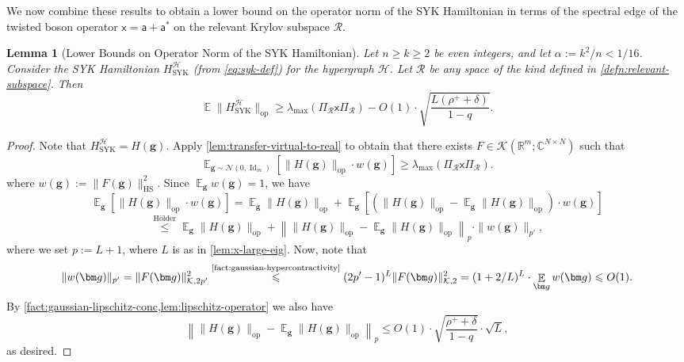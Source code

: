 \documentclass
[11pt,letterpaper]
{article}
\newtheorem{lemma}[theorem]{Lemma}
\theoremstyle{definition}
\newcommand{\cN}{\mathcal{N}}
\newcommand{\sfa}{\mathsf a}
\newcommand{\sfx}{\mathsf x}
\newcommand{\R}{{\mathbb R}}
\newcommand{\1}{\mathbf{1}}
\newcommand{\C}{\mathbb C}
\newcommand{\cH}{\mathcal H}
\newcommand{\Id}{\operatorname{Id}}
\DeclareMathOperator*{\E}{\mathbb{E}}
\newcommand{\cR}{\mathcal R}
\newcommand{\cK}{\mathcal K}
\renewcommand{\geq}{\geqslant}
\renewcommand{\leq}{\leqslant}
\begin{document}
We now combine these results to obtain a lower bound on the operator norm of the SYK Hamiltonian in terms of the spectral edge of the twisted boson operator $\sfx = \sfa + \sfa^*$ on the relevant Krylov subspace $\cR$.
\begin{lemma}[Lower Bounds on Operator Norm of the SYK Hamiltonian]\label{lem:lower-bound-syk-general}
    Let $n\geq k\geq 2$ be even integers, and let $\alpha:= k^2/n < 1/16$. Consider the SYK Hamiltonian $H^\cH_{\operatorname{SYK}}$ (from \cref{eq:syk-def}) for the hypergraph $\cH$. Let $\cR$ be any space of the kind defined in \cref{defn:relevant-subspace}. Then
    \[\E\|H^\cH_{\operatorname{SYK}}\|_{\operatorname{op}}\geq \lambda_{\max}(\Pi_\cR\sfx\Pi_\cR) - O(1)\cdot \sqrt{\frac{L(\rho^+ + \delta)}{1 - q}}.\]
\end{lemma}
\begin{proof}
    Note that $H^\cH_{\operatorname{SYK}} = H(\bm g)$. Apply \cref{lem:transfer-virtual-to-real} to obtain that there exists $F\in\cK(\R^m;\C^{N\times N})$ such that 
    \[\E_{\bm g\sim\cN(0, \Id_m)}\left[\|H(\bm g)\|_{\operatorname{op}}\cdot w(\bm g)\right]\geq\lambda_{\max}(\Pi_\cR\sfx\Pi_\cR).\]
    where $w(\bm g) := \|F(\bm g)\|^2_{\operatorname{HS}}$. Since $\E_{\bm g}w(\bm g) = 1$, we have 
    \[\E_{\bm g}\left[\|H(\bm g)\|_{\operatorname{op}}\cdot w(\bm g)\right] = \E_{\bm g}\|H(\bm g)\|_{\operatorname{op}} + \E_{\bm g}\left[\left(\|H(\bm g)\|_{\operatorname{op}} - \E_{\bm g}\|H(\bm g)\|_{\operatorname{op}}\right)\cdot w(\bm g)\right]\]
    \[\overset{\text{H\"{o}lder}}{\leq}\E_{\bm g}\|H(\bm g)\|_{\operatorname{op}} + \left\|\|H(\bm g)\|_{\operatorname{op}} - \E_{\bm g}\|H(\bm g)\|_{\operatorname{op}}\right\|_p\cdot \|w(\bm g)\|_{p'},\]
    where we set $p:= L + 1$, where $L$ is as in \cref{lem:x-large-eig}. Now, note that
    \[\|w(\bm g)\|_{p'} = \|F(\bm g)\|_{\cK, 2p'}^2\overset{\text{\cref{fact:gaussian-hypercontractivity}}}{\leq}(2p' - 1)^L\|F(\bm g)\|_{\cK, 2}^2 = (1 + 2/L)^L\cdot\E_{\bm g}w(\bm g)\leq O(1).\]
    By \cref{fact:gaussian-lipschitz-conc,lem:lipschitz-operator} we also have 
    \[ \left\|\|H(\bm g)\|_{\operatorname{op}} - \E_{\bm g}\|H(\bm g)\|_{\operatorname{op}}\right\|_p\leq O(1)\cdot \sqrt{\frac{\rho^+ + \delta}{1 - q}}\cdot\sqrt{L},\]
    as desired. 
\end{proof}
\end{document}
